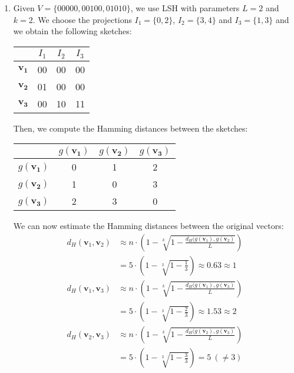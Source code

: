 \begin{enumerate}
  \item Given $V = \{00000, 00100, 01010\}$, we use LSH with parameters $L = 2$
  and $k = 2$. We choose the projections $I_1 = \{ 0, 2 \}$, $I_2 = \{ 3, 4
  \}$ and $I_3 = \{1, 3 \}$ and we obtain the following sketches:
  \begin{table}[H]
    \centering
    \begin{tabular}{c|c|c|c|}
      & $I_1$ & $I_2$ & $I_3$ \\ \hline
      $\mathbf{v_1}$ & 00 & 00 & 00\\ \hline
      $\mathbf{v_2}$ & 01 & 00 & 00\\ \hline
      $\mathbf{v_3}$ & 00 & 10 & 11\\ \hline
    \end{tabular}
  \end{table}
  Then, we compute the Hamming distances between the sketches:
  \begin{table}[H]
    \centering
    \begin{tabular}{c|c|c|c|}
      & $g(\mathbf{v_1})$ & $g(\mathbf{v_2})$ & $g(\mathbf{v_3})$ \\ \hline
      $g(\mathbf{v_1})$ & 0 & 1 & 2 \\ \hline
      $g(\mathbf{v_2})$ & 1 & 0 & 3 \\ \hline
      $g(\mathbf{v_3})$ & 2 & 3 & 0 \\ \hline
    \end{tabular}
  \end{table}
  We can now estimate the Hamming distances between the original vectors:
  \begin{align*}
    d_H(\mathbf{v}_1, \mathbf{v}_2) &\approx
    n \cdot \left( 1 - \sqrt[k]{1 - \frac{d_H(g(\mathbf{v}_1),
    g(\mathbf{v}_2)}{L}} \right) \\
    &= 5 \cdot \left( 1 - \sqrt[3]{1 - \frac{1}{3}} \right) \approx 0.63
    \approx 1 \\
    d_H(\mathbf{v}_1, \mathbf{v}_3) &\approx
    n \cdot \left( 1 - \sqrt[k]{1 - \frac{d_H(g(\mathbf{v}_1),
    g(\mathbf{v}_3)}{L}} \right) \\
    &= 5 \cdot \left( 1 - \sqrt[3]{1 - \frac{2}{3}} \right) \approx 1.53
    \approx 2 \\
    d_H(\mathbf{v}_2, \mathbf{v}_3) &\approx
    n \cdot \left( 1 - \sqrt[k]{1 - \frac{d_H(g(\mathbf{v}_2),
    g(\mathbf{v}_3)}{L}} \right) \\
    &= 5 \cdot \left( 1 - \sqrt[3]{1 - \frac{3}{3}} \right) = 5\ (\neq 3) \\
  \end{align*}

\end{enumerate}
